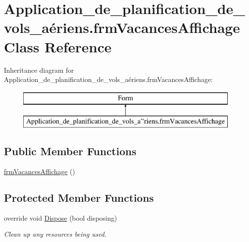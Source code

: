 \hypertarget{class_application__de__planification__de__vols__a_xC3_xA9riens_1_1frm_vacances_affichage}{}\section{Application\+\_\+de\+\_\+planification\+\_\+de\+\_\+vols\+\_\+aériens.\+frm\+Vacances\+Affichage Class Reference}
\label{class_application__de__planification__de__vols__a_xC3_xA9riens_1_1frm_vacances_affichage}
Inheritance diagram for Application\+\_\+de\+\_\+planification\+\_\+de\+\_\+vols\+\_\+aériens.\+frm\+Vacances\+Affichage\+:\begin{figure}[H]
\begin{center}
\leavevmode
\includegraphics[height=2.000000cm]{class_application__de__planification__de__vols__a_xC3_xA9riens_1_1frm_vacances_affichage}
\end{center}
\end{figure}
\subsection*{Public Member Functions}
\begin{DoxyCompactItemize}
\item 
\hyperlink{class_application__de__planification__de__vols__a_xC3_xA9riens_1_1frm_vacances_affichage_a57aef6187251bbd4621c83517a46a73f}{frm\+Vacances\+Affichage} ()
\end{DoxyCompactItemize}
\subsection*{Protected Member Functions}
\begin{DoxyCompactItemize}
\item 
override void \hyperlink{class_application__de__planification__de__vols__a_xC3_xA9riens_1_1frm_vacances_affichage_afc0b73ee79ce33aadb85a91c77c9ce0e}{Dispose} (bool disposing)
\begin{DoxyCompactList}\small\item\em Clean up any resources being used. \end{DoxyCompactList}\end{DoxyCompactItemize}


